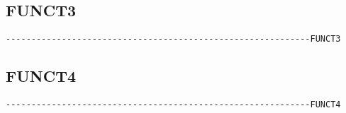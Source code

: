 \subsection{FUNCT3}
\begin{verbatim}
------------------------------------------------------------FUNCT3
\end{verbatim}



\subsection{FUNCT4}
\begin{verbatim}
------------------------------------------------------------FUNCT4
\end{verbatim}

